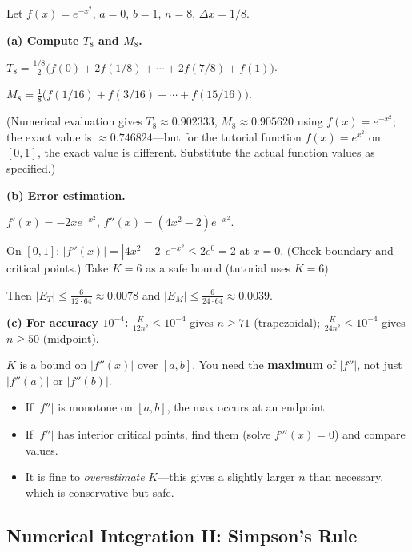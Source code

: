 \begin{examplebox}[title={Worked Example (Tutorial 6, Q2): $T_8$, $M_8$ and error for $\int_0^1 e^{-x^2}\,dx$}]

Let $f(x)=e^{-x^2}$, $a=0$, $b=1$, $n=8$, $\Delta x = 1/8$.

\textbf{(a) Compute $T_8$ and $M_8$.}

$T_8 = \frac{1/8}{2}\bigl(f(0)+2f(1/8)+\cdots+2f(7/8)+f(1)\bigr)$.

$M_8 = \frac18\bigl(f(1/16)+f(3/16)+\cdots+f(15/16)\bigr)$.

(Numerical evaluation gives $T_8\approx 0.902333$, $M_8\approx 0.905620$ using $f(x)=e^{-x^2}$; the exact value is $\approx 0.746824$---but for the tutorial function $f(x)=e^{x^2}$ on $[0,1]$, the exact value is different. Substitute the actual function values as specified.)

\textbf{(b) Error estimation.}

$f'(x) = -2xe^{-x^2}$, $f''(x) = (4x^2-2)e^{-x^2}$.

On $[0,1]$: $|f''(x)| = |4x^2-2|\,e^{-x^2} \le 2e^0 = 2$ at $x=0$. (Check boundary and critical points.) Take $K=6$ as a safe bound (tutorial uses $K=6$).

Then $|E_T|\le \frac{6}{12\cdot 64}\approx 0.0078$ and $|E_M|\le \frac{6}{24\cdot 64}\approx 0.0039$.

\textbf{(c) For accuracy $10^{-4}$:} $\frac{K}{12n^2}\le 10^{-4}$ gives $n\ge 71$ (trapezoidal); $\frac{K}{24n^2}\le 10^{-4}$ gives $n\ge 50$ (midpoint).

\end{examplebox}

\begin{commonmistake}[title={Common Mistake: Choosing $K$ incorrectly}]
$K$ is a bound on $|f''(x)|$ over $[a,b]$. You need the \textbf{maximum} of $|f''|$, not just $|f''(a)|$ or $|f''(b)|$.
\begin{itemize}[leftmargin=*]
\item If $|f''|$ is monotone on $[a,b]$, the max occurs at an endpoint.
\item If $|f''|$ has interior critical points, find them (solve $f'''(x)=0$) and compare values.
\item It is fine to \emph{overestimate} $K$---this gives a slightly larger $n$ than necessary, which is conservative but safe.
\end{itemize}
\end{commonmistake}

\subsection{Numerical Integration II: Simpson's Rule}


